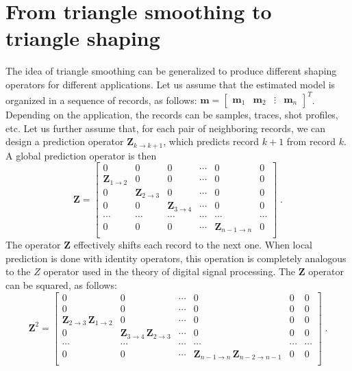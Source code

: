 \section{From triangle smoothing to triangle shaping}
The idea of triangle smoothing can be generalized to produce different shaping
operators for different applications. Let us assume that the estimated model
is organized in a sequence of records, as follows: $\mathbf{m} = \left[\begin{array}{cccc}
    \mathbf{m}_1 &
    \mathbf{m}_2 &
    \vdots &
    \mathbf{m}_n
  \end{array}\right]^T$.
Depending on the application, the records can be samples, traces, shot
profiles, etc. Let us further assume that, for each pair of neighboring
records, we can design a prediction operator $\mathbf{Z}_{k \rightarrow k+1}$,
which predicts record $k+1$ from record $k$. A global prediction operator is
then
\begin{equation}
  \label{eq:z}
  \mathbf{Z} = \left[\begin{array}{cccccc}
      0 & 0 & 0 & \cdots & 0 & 0 \\
      \mathbf{Z}_{1 \rightarrow 2} & 0 & 0 & \cdots & 0 & 0 \\
      0 & \mathbf{Z}_{2 \rightarrow 3} & 0 & \cdots & 0 & 0 \\
      0 & 0 & \mathbf{Z}_{3 \rightarrow 4} & \cdots & 0 & 0 \\
      \cdots & \cdots & \cdots & \cdots & \cdots & \cdots \\
      0 & 0 & 0 & \cdots & \mathbf{Z}_{n-1 \rightarrow n} & 0 \\
    \end{array}\right]\;.
\end{equation}
The operator $\mathbf{Z}$ effectively shifts each record to the next one. When
local prediction is done with identity operators, this operation is completely
analogous to the $Z$ operator used in the theory of digital signal processing. 
The $\mathbf{Z}$ operator can be squared, as follows:
\begin{equation}
  \label{eq:z2}
  \mathbf{Z}^2 = \left[\begin{array}{cccccc}
      0 & 0 & \cdots & 0 & 0 & 0 \\
      0 & 0 & \cdots & 0 & 0 & 0 \\
      \mathbf{Z}_{2 \rightarrow 3}\, \mathbf{Z}_{1 \rightarrow 2} & 0 & 
      \cdots & 0 & 0 & 0 \\
      0 & \mathbf{Z}_{3 \rightarrow 4}\, \mathbf{Z}_{2 \rightarrow 3} & 
      \cdots & 0 & 0 & 0 \\
      \cdots & \cdots & \cdots & \cdots & \cdots& \cdots \\
      0 & 0 & \cdots & 
      \mathbf{Z}_{n-1 \rightarrow n}\,\mathbf{Z}_{n-2 \rightarrow n-1} & 
      0 & 0 \\
    \end{array}\right]\;.
\end{equation}
